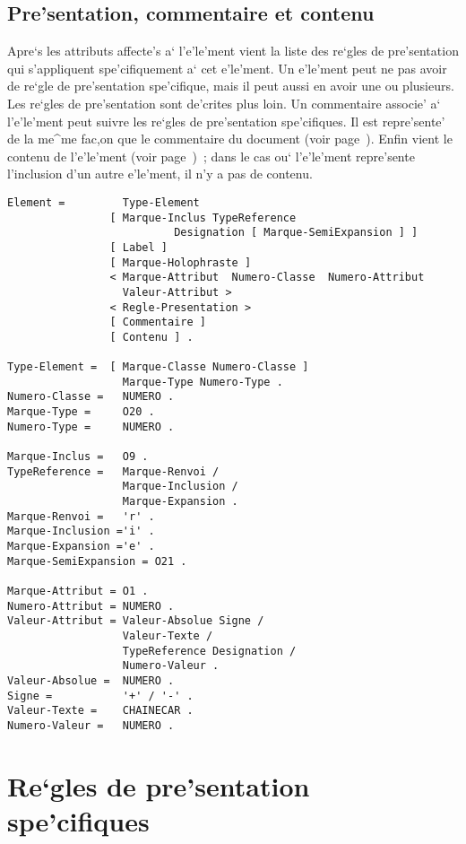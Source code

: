 \subsection{Pre'sentation, commentaire et contenu}
\label{prescom}

Apre`s les attributs affecte's a` l'e'le'ment vient la liste des re`gles de
pre'sentation qui s'appliquent spe'cifiquement a` cet e'le'ment. Un e'le'ment
peut ne pas avoir de re`gle de pre'sentation spe'cifique, mais il peut aussi
en avoir une ou plusieurs. Les re`gles de pre'sentation sont de'crites plus
loin. Un commentaire associe' a` l'e'le'ment peut suivre les re`gles de
pre'sentation spe'cifiques. Il est repre'sente' de la me^me fac,on que le
commentaire du document (voir page~\pageref{comment}). Enfin vient le
contenu de l'e'le'ment (voir page~\pageref{contenu})~; dans le cas ou`
l'e'le'ment repre'sente l'inclusion d'un autre e'le'ment, il n'y a pas
de contenu.

\begin{verbatim}
Element =         Type-Element
                [ Marque-Inclus TypeReference
                          Designation [ Marque-SemiExpansion ] ]
                [ Label ]
                [ Marque-Holophraste ]
                < Marque-Attribut  Numero-Classe  Numero-Attribut
                  Valeur-Attribut >
                < Regle-Presentation >
                [ Commentaire ]
                [ Contenu ] .

Type-Element =  [ Marque-Classe Numero-Classe ]
                  Marque-Type Numero-Type .
Numero-Classe =   NUMERO .
Marque-Type =     O20 .
Numero-Type =     NUMERO .

Marque-Inclus =   O9 .
TypeReference =   Marque-Renvoi /
                  Marque-Inclusion /
                  Marque-Expansion .
Marque-Renvoi =   'r' .
Marque-Inclusion ='i' .
Marque-Expansion ='e' .
Marque-SemiExpansion = O21 .

Marque-Attribut = O1 .
Numero-Attribut = NUMERO .
Valeur-Attribut = Valeur-Absolue Signe /
                  Valeur-Texte /
                  TypeReference Designation /
                  Numero-Valeur .
Valeur-Absolue =  NUMERO .
Signe =           '+' / '-' .
Valeur-Texte =    CHAINECAR .
Numero-Valeur =   NUMERO .
\end{verbatim}

\section{Re`gles de pre'sentation spe'cifiques}

